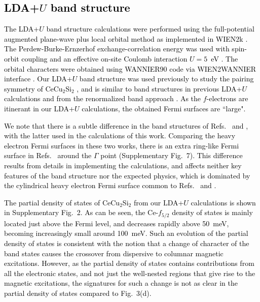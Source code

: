 \documentclass[aps,prl,onecolumn,amsmath,amssymb,superscriptaddress]{revtex4}
\newcommand{\yy}{\textcolor{black}}
\begin{document}

\yy{
\subsection{LDA+$U$ band structure}
The LDA+$U$ band structure calculations were performed using the full-potential augmented plane-wave plus local orbital method as implemented in WIEN2k \cite{WIEN2k}. The Perdew-Burke-Ernzerhof exchange-correlation energy \cite{PBE} was used with spin-orbit coupling and an effective on-site Coulomb interaction $U = 5$~eV \cite{VIAnisimov}. The orbital characters were obtained using WANNIER90 code \cite{AAMostofi} via WIEN2WANNIER interface \cite{JKunes}. Our LDA+$U$ band structure was used previously to study the pairing symmetry of CeCu$_2$Si$_2$ \cite{YLi2018}, and is similar to band structures in previous LDA+$U$ calculations \cite{SKittaka2014,HIkeda2015} and from the renormalized band approach \cite{GZwicknagl1993}. %
As the $f$-electrons are itinerant in our LDA+$U$ calculations, the obtained Fermi surfaces are ``large".
}

\yy{
We note that there is a subtle difference in the band structures of Refs.~\cite{HIkeda2015} and \cite{YLi2018}, with the latter used in the calculations of this work. Comparing the heavy electron Fermi surfaces in these two works, there is an extra ring-like Fermi surface in Refs.~\cite{YLi2018} around the $\Gamma$ point (Supplementary Fig.~7). This difference results from details in implementing the calculations, and affects neither key features of the band structure nor the expected physics, which is dominated by the cylindrical heavy electron Fermi surface common to Refs.~\cite{HIkeda2015} and \cite{YLi2018}.
}

\yy{
The partial density of states of CeCu$_2$Si$_2$ from our LDA+$U$ calculations is shown in Supplementary Fig.~2. As can be seen, the Ce-$f_{5/2}$ density of states is mainly located just above the Fermi level, and decreases rapidly above 50~meV, becoming increasingly small around 100~meV.  Such an evolution of the partial density of states is consistent with the notion that a change of character of the band states causes the crossover from dispersive to columnar magnetic excitations. However, as the partial density of states contains contributions from all the electronic states, and not just the well-nested regions that give rise to the magnetic excitations, the signatures for such a change is not as clear in the partial density of states compared to Fig.~3(d). 
}
\end{document}
